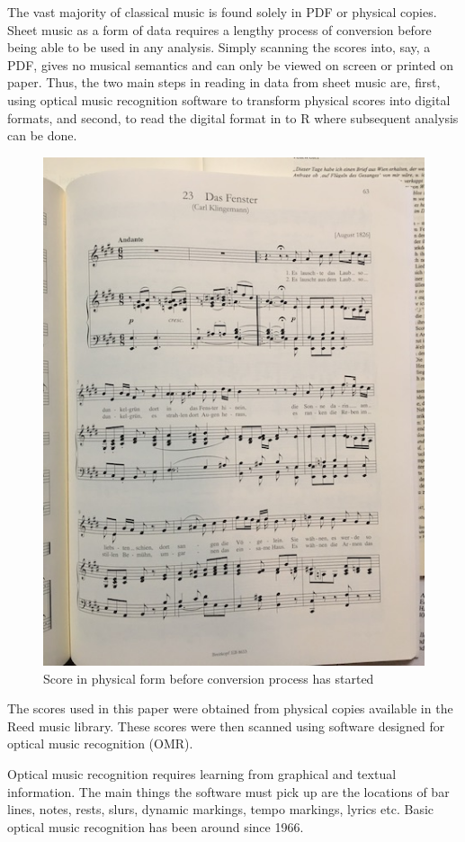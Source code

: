 \documentclass[12pt,twoside]{reedthesis}
\theoremstyle{definition}
\theoremstyle{definition}
\theoremstyle{definition}
\theoremstyle{remark}
\begin{document}
The vast majority of classical music is found solely in PDF or physical
copies. Sheet music as a form of data requires a lengthy process of
conversion before being able to be used in any analysis. Simply scanning
the scores into, say, a PDF, gives no musical semantics and can only be
viewed on screen or printed on paper. Thus, the two main steps in
reading in data from sheet music are, first, using optical music
recognition software to transform physical scores into digital formats,
and second, to read the digital format in to R where subsequent analysis
can be done.
\begin{figure}[h]
\centering
\includegraphics[scale=.50]{images/scorephoto.JPG}
\caption{Score in physical form before conversion process has started}
\label{subd}
\end{figure}
The scores used in this paper were obtained from physical copies
available in the Reed music library. These scores were then scanned
using software designed for optical music recognition (OMR).

Optical music recognition requires learning from graphical and textual
information. The main things the software must pick up are the locations
of bar lines, notes, rests, slurs, dynamic markings, tempo markings,
lyrics etc. Basic optical music recognition has been around since 1966.
\end{document}
